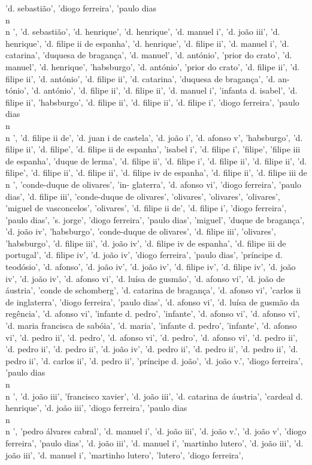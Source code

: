 \documentclass{article}
\begin{document}
\begin{itemize}
'd. sebastião', 'diogo ferreira', 'paulo dias\\n\\n ', 'd. sebastião', 'd. henrique', 'd. henrique', 'd. manuel i', 'd. joão iii', 'd. henrique', 'd. filipe ii de espanha', 'd. henrique', 'd. filipe ii', 'd. manuel i', 'd. catarina', 'duquesa de bragança', 'd. manuel', 'd. antónio', 'prior do crato', 'd. manuel', 'd. henrique', 'habsburgo', 'd. antónio', 'prior do crato', 'd. filipe ii', 'd. filipe ii', 'd. antónio', 'd. filipe ii', 'd. catarina', 'duquesa de bragança', 'd. an-tónio', 'd. antónio', 'd. filipe ii', 'd. filipe ii', 'd. manuel i', 'infanta d. isabel', 'd. filipe ii', 'habsburgo', 'd. filipe ii', 'd. filipe ii', 'd. filipe i', 'diogo ferreira', 'paulo dias\\n\\n ', 'd. filipe ii de', 'd. juan i de castela', 'd. joão i', 'd. afonso v', 'habsburgo', 'd. filipe ii', 'd. filipe', 'd. filipe ii de espanha', 'isabel i', 'd. filipe i', 'filipe', 'filipe iii de espanha', 'duque de lerma', 'd. filipe ii', 'd. filipe i', 'd. filipe ii', 'd. filipe ii', 'd. filipe', 'd. filipe ii', 'd. filipe ii', 'd. filipe iv de espanha', 'd. filipe ii', 'd. filipe iii de\\n ', 'conde-duque de olivares', 'in- glaterra', 'd. afonso vi', 'diogo ferreira', 'paulo dias', 'd. filipe iii', 'conde-duque de olivares', 'olivares', 'olivares', 'olivares', 'miguel de vasconcelos', 'olivares', 'd. filipe ii de', 'd. filipe i', 'diogo ferreira', 'paulo dias', 's. jorge', 'diogo ferreira', 'paulo dias', 'miguel', 'duque de bragança', 'd. joão iv', 'habsburgo', 'conde-duque de olivares', 'd. filipe iii', 'olivares', 'habsburgo', 'd. filipe iii', 'd. joão iv', 'd. filipe iv de espanha', 'd. filipe iii de portugal', 'd. filipe iv', 'd. joão iv', 'diogo ferreira', 'paulo dias', 'príncipe d. teodósio', 'd. afonso', 'd. joão iv', 'd. joão iv', 'd. filipe iv', 'd. filipe iv', 'd. joão iv', 'd. joão iv', 'd. afonso vi', 'd. luísa de gusmão', 'd. afonso vi', 'd. joão de áustria', 'conde de schomberg', 'd. catarina de bragança', 'd. afonso vi', 'carlos ii de inglaterra', 'diogo ferreira', 'paulo dias', 'd. afonso vi', 'd. luísa de gusmão da regência', 'd. afonso vi', 'infante d. pedro', 'infante', 'd. afonso vi', 'd. afonso vi', 'd. maria francisca de sabóia', 'd. maria', 'infante d. pedro', 'infante', 'd. afonso vi', 'd. pedro ii', 'd. pedro', 'd. afonso vi', 'd. pedro', 'd. afonso vi', 'd. pedro ii', 'd. pedro ii', 'd. pedro ii', 'd. joão iv', 'd. pedro ii', 'd. pedro ii', 'd. pedro ii', 'd. pedro ii', 'd. carlos ii', 'd. pedro ii', 'príncipe d. joão', 'd. joão v.', 'diogo ferreira', 'paulo dias\\n\\n ', 'd. joão iii', 'francisco xavier', 'd. joão iii', 'd. catarina de áustria', 'cardeal d. henrique', 'd. joão iii', 'diogo ferreira', 'paulo dias\\n\\n ', 'pedro álvares cabral', 'd. manuel i', 'd. joão iii', 'd. joão v.', 'd. joão v', 'diogo ferreira', 'paulo dias', 'd. joão iii', 'd. manuel i', 'martinho lutero', 'd. joão iii', 'd. joão iii', 'd. manuel i', 'martinho lutero', 'lutero', 'diogo ferreira', 
\end{itemize}
\end{document}
